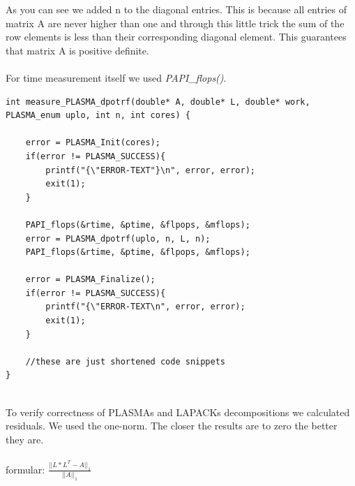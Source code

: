 \documentclass[a4paper,final,ngerman,english]{article}
\begin{document}
As you can see we added n to the diagonal entries. This is because all entries of matrix A are never higher than one and through this little trick the sum of the row elements is less than their corresponding diagonal element. This guarantees that matrix A is positive definite.\\
\ \\
For time measurement itself we used \textit{PAPI\_flops()}.
\begin{lstlisting}
int measure_PLASMA_dpotrf(double* A, double* L, double* work, PLASMA_enum uplo, int n, int cores) {

	error = PLASMA_Init(cores);
	if(error != PLASMA_SUCCESS){
		printf("{\"ERROR-TEXT"}\n", error, error);
		exit(1);
	}

	PAPI_flops(&rtime, &ptime, &flpops, &mflops);
	error = PLASMA_dpotrf(uplo, n, L, n);
	PAPI_flops(&rtime, &ptime, &flpops, &mflops);

	error = PLASMA_Finalize();
	if(error != PLASMA_SUCCESS){
		printf("{\"ERROR-TEXT\n", error, error);
		exit(1);
	}
	
	//these are just shortened code snippets
}
\end{lstlisting}
\ \\
To verify correctness of PLASMAs and LAPACKs decompositions we calculated residuals.
We used the one-norm. The closer the results are to zero the better they are.\\
\ \\
formular:
\(\frac{||L*L^T-A||_1}{||A||_1}\)\\
\end{document}
